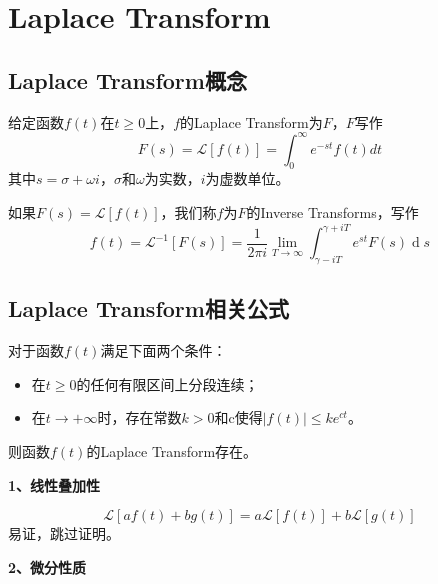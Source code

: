 \documentclass[lang=cn,10pt]{elegantbook}
\newcommand\mc[1]{\mathcal{#1}}
\begin{document}
\section{Laplace Transform}

\subsection{Laplace Transform概念}
\begin{definition}
	给定函数$f(t)$在$t \geq 0$上，$f$的Laplace Transform为$F$，$F$写作
	\begin{equation}
		F(s)=\mathcal{L}[f(t)]=\int_{0}^{\infty}e^{-st}f(t)dt
	\end{equation}
	其中$s = \sigma + \omega i$，$\sigma$和$\omega$为实数，$i$为虚数单位。
\end{definition}

\begin{definition}
	如果$F(s) = \mc{L}[f(t)]$，我们称$f$为$F$的Inverse Transforms，写作
	\begin{equation}
		f(t) = \mc{L}^{-1}[F(s)]=
		\frac1{2\pi i}\lim_{T\to\infty}\int_{\gamma-iT}^{\gamma+iT}e^{st}F(s)\operatorname{d}s
	\end{equation}
\end{definition}

\subsection{Laplace Transform相关公式}
\begin{theorem}
	对于函数$f(t)$满足下面两个条件：
	\begin{itemize}
		\item 在$t\geq 0$的任何有限区间上分段连续；
		\item 在$t \rightarrow +\infty $时，存在常数$k > 0$和c使得$|f(t)|\leq ke^{ct}$。
	\end{itemize}
	则函数$f(t)$的Laplace Transform存在。
\end{theorem}

\textbf{1、线性叠加性}

\begin{equation}
	\mathcal{L}\left[af\left(t\right)+bg\left(t\right)\right]=
	a\mathcal{L}\left[f\left(t\right)\right]+b\mathcal{L}\left[g\left(t\right)\right]
\end{equation}
易证，跳过证明。

\textbf{2、微分性质}
\end{document}
